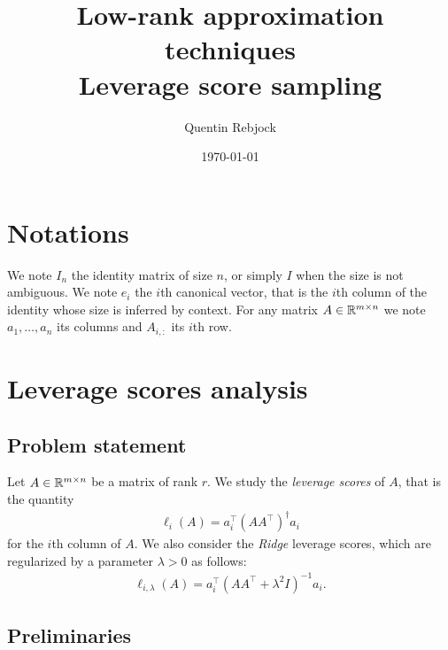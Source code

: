 \documentclass{article}
\title{Low-rank approximation techniques \\ \Large Leverage score sampling}
\author{Quentin Rebjock}
\date{\today}
\begin{document}
\maketitle

\section{Notations}\label{sec:notations}

We note $I_n$ the identity matrix of size $n$, or simply $I$ when the size is
not ambiguous.
We note $e_i$ the $i$th canonical vector, that is the $i$th column of the
identity whose size is inferred by context.
For any matrix $A \in {\mathbb R}^{m \times n}$ we note $a_1, \dots, a_n$ its columns
and $A_{i,:}$ its $i$th row.

\section{Leverage scores analysis}\label{sec:questions}

\subsection{Problem statement}\label{subsec:probstat}

Let $A \in {\mathbb R}^{m \times n}$ be a matrix of rank $r$.
We study the \textit{leverage scores} of $A$, that is the quantity
\begin{align*}
  \ell_i(A) = a_i^\top (A A^\top)^\dagger a_i
\end{align*}
for the $i$th column of $A$.
We also consider the \textit{Ridge} leverage scores, which are regularized by a
parameter $\lambda > 0$ as follows:
\begin{align*}
  \ell_{i,\lambda}(A) = a_i^\top (A A^\top + \lambda^2 I)^{-1} a_i.
\end{align*}

\subsection{Preliminaries}\label{subsec:preliminaries}
\end{document}
